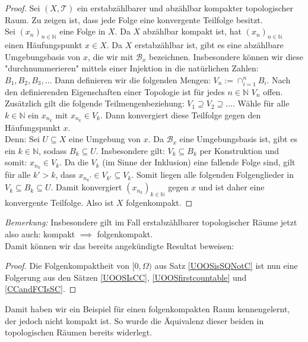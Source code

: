 \documentclass[11pt]{scrartcl}
\begin{document}
\begin{proof}
	Sei $(X,\mathcal T)$ ein erstabzählbarer und abzählbar kompakter topologischer Raum. Zu zeigen ist, dass jede Folge
	eine konvergente Teilfolge besitzt.\\
	Sei $(x_n)_{n\in\mathbb N}$ eine Folge in $X$. Da $X$ abzählbar kompakt ist, hat $(x_n)_{n\in\mathbb N}$ einen
	Häufungspunkt $x\in X$. Da $X$ erstabzählbar ist, gibt es eine abzählbare Umgebungsbasis von $x$, die wir mit $\mathcal B_x$ bezeichnen. Insbesondere
	können wir diese "durchnummerieren" mittels einer Injektion in die natürlichen Zahlen: $B_1,B_2,B_3,\dots$ Dann definieren wir die
	folgenden Mengen: $V_n:= \cap_{i=1}^n B_i$. Nach den definierenden Eigenschaften einer Topologie ist für jedes $n\in\mathbb N$ 
	$V_n$ offen. Zusätzlich gilt die folgende Teilmengenbeziehung: $V_1 \supseteq V_2 \supseteq \dots$. Wähle für alle $k\in\mathbb N$ ein $x_{n_k}$
	mit $x_{n_k}\in V_k$. Dann konvergiert diese Teilfolge gegen den Häufungspunkt $x$.\\
	Denn: Sei $U \subseteq X$ eine Umgebung von $x$. Da $\mathcal B_x$ eine Umgebungsbasis ist, gibt es ein $k\in\mathbb N$, sodass $ B_k \subseteq U$. 
	Insbesondere gilt: $ V_k \subseteq B_k$ per Konstruktion und somit: $x_{n_k}\in V_k$. Da die $V_k$ (im Sinne der Inklusion) eine fallende Folge
        sind, gilt für alle $k'>k$, dass $x_{n_k'}\in V_{k'} \subseteq V_k$. Somit liegen alle folgenden Folgenglieder in $V_k \subseteq B_k \subseteq U$.
	Damit konvergiert $(x_{n_k})_{k\in\mathbb N}$ gegen $x$ und ist daher eine konvergente Teilfolge. Also ist $X$ folgenkompakt.
\end{proof}
\textit{Bemerkung:} Insbesondere gilt im Fall erstabzählbarer topologischer Räume jetzt also auch: kompakt $\implies$ folgenkompakt.\\
Damit können wir das bereits angekündigte Resultat beweisen:
\begin{proof}
	Die Folgenkompaktheit von $[0, \Omega)$ aus Satz \ref{UOOSisSQNotC} ist nun eine Folgerung aus den Sätzen
	\ref{UOOSIsCC}, \ref{UOOSfirstcountable} und \ref{CCandFCIsSC}.
\end{proof}
\noindent Damit haben wir ein Beispiel für einen folgenkompakten Raum kennengelernt, der jedoch nicht kompakt ist.
So wurde die Äquivalenz dieser beiden in topologischen Räumen bereits widerlegt.
\end{document}
